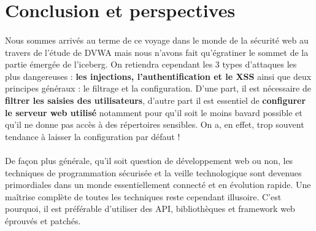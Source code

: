 \section{Conclusion et perspectives}


\paragraph{} 
\justify 
Nous sommes arrivés au terme de ce voyage dans le monde de la sécurité web au travers de l'étude de DVWA mais nous n'avons fait qu'égratiner le sommet de la partie émergée de l'iceberg. On retiendra cependant les 3 types d'attaques les plus dangereuses : \textbf{ les injections, l'authentification et le XSS} ainsi que deux principes généraux : le filtrage et la configuration. D'une part, il est nécessaire de \textbf{filtrer les saisies des utilisateurs}, d'autre part il est essentiel de \textbf{configurer le serveur web utilisé} notamment pour qu'il soit le moins bavard possible et qu'il ne donne pas accès à des répertoires sensibles. On a, en effet, trop souvent tendance à laisser la configuration par défaut ! 

\paragraph{} De façon plus générale, qu'il soit question de développement web ou non, les techniques de programmation sécurisée et la veille technologique sont devenues pri\-mor\-dia\-les dans un monde essen\-tielle\-ment connecté et en évolution rapide. Une maîtrise complète de toutes les techniques reste cependant illusoire. C'est pourquoi, il est préférable d'utiliser des API, bibliothèques et framework web éprouvés et patchés.

